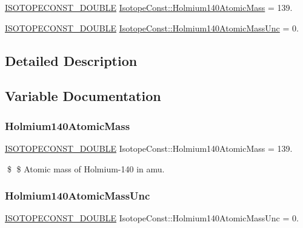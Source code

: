 \begin{DoxyCompactItemize}
\item 
\mbox{\hyperlink{group___isotope_const-_macros_ga8f45a7272ce02c0b4c65c44636ed719a}{I\+S\+O\+T\+O\+P\+E\+C\+O\+N\+S\+T\+\_\+\+D\+O\+U\+B\+LE}} \mbox{\hyperlink{group___isotope_const-_holmium-_ho140_gadd284691af65c136f6f622d7127c2766}{Isotope\+Const\+::\+Holmium140\+Atomic\+Mass}} = 139.
\item 
\mbox{\hyperlink{group___isotope_const-_macros_ga8f45a7272ce02c0b4c65c44636ed719a}{I\+S\+O\+T\+O\+P\+E\+C\+O\+N\+S\+T\+\_\+\+D\+O\+U\+B\+LE}} \mbox{\hyperlink{group___isotope_const-_holmium-_ho140_gad002a15bceeb5b99bd66fa01196b7da7}{Isotope\+Const\+::\+Holmium140\+Atomic\+Mass\+Unc}} = 0.
\end{DoxyCompactItemize}


\subsection{Detailed Description}


\subsection{Variable Documentation}
\mbox{\label{group___isotope_const-_holmium-_ho140_gadd284691af65c136f6f622d7127c2766}} 
\subsubsection{\texorpdfstring{Holmium140\+Atomic\+Mass}{Holmium140AtomicMass}}
{\footnotesize\ttfamily \mbox{\hyperlink{group___isotope_const-_macros_ga8f45a7272ce02c0b4c65c44636ed719a}{I\+S\+O\+T\+O\+P\+E\+C\+O\+N\+S\+T\+\_\+\+D\+O\+U\+B\+LE}} Isotope\+Const\+::\+Holmium140\+Atomic\+Mass = 139.}

\$ \$ Atomic mass of Holmium-\/140 in amu. \mbox{\label{group___isotope_const-_holmium-_ho140_gad002a15bceeb5b99bd66fa01196b7da7}} 
\subsubsection{\texorpdfstring{Holmium140\+Atomic\+Mass\+Unc}{Holmium140AtomicMassUnc}}
{\footnotesize\ttfamily \mbox{\hyperlink{group___isotope_const-_macros_ga8f45a7272ce02c0b4c65c44636ed719a}{I\+S\+O\+T\+O\+P\+E\+C\+O\+N\+S\+T\+\_\+\+D\+O\+U\+B\+LE}} Isotope\+Const\+::\+Holmium140\+Atomic\+Mass\+Unc = 0.}

